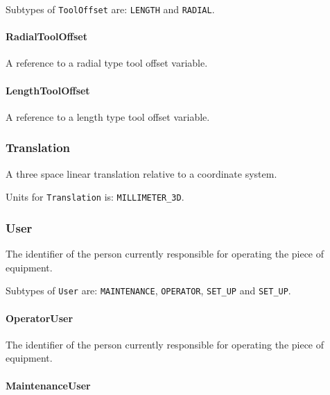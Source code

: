 Subtypes of \texttt{ToolOffset} are: \texttt{LENGTH} and \texttt{RADIAL}. 
\FloatBarrier

\paragraph{RadialToolOffset}\mbox{}
\label{sec:RadialToolOffset}



A reference to a radial type tool offset variable.


\paragraph{LengthToolOffset}\mbox{}
\label{sec:LengthToolOffset}



A reference to a length type tool offset variable.


\subsubsection{Translation}




A three space linear translation relative to a coordinate system.



Units for \texttt{Translation} is: \texttt{MILLIMETER_3D}.

\FloatBarrier

\subsubsection{User}
\label{sec:User}



The identifier of the person currently responsible for operating the piece of equipment.


Subtypes of \texttt{User} are: \texttt{MAINTENANCE}, \texttt{OPERATOR}, \texttt{SET_UP} and \texttt{SET_UP}. 
\FloatBarrier

\paragraph{OperatorUser}\mbox{}
\label{sec:OperatorUser}



The identifier of the person currently responsible for operating the piece of equipment.


\paragraph{MaintenanceUser}\mbox{}
\label{sec:MaintenanceUser}



